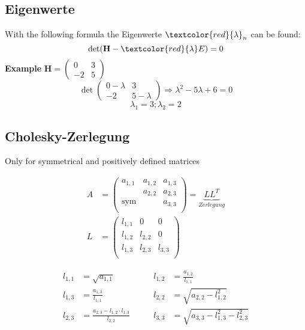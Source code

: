 \subsection{Eigenwerte}\label{eigenwerte}
With the following formula the Eigenwerte $\textcolor{red}{\lambda}_n$ can be found:
\begin{equation}
	\det(\mathbf{H} - \textcolor{red}{\lambda} E) = 0
\end{equation}
\noindent\textbf{Example}
$\mathbf{H} = \begin{pmatrix} 0 & 3 \\ -2 & 5 \end{pmatrix}$
\\
\[\det\begin{pmatrix}
	0 - \lambda & 3 \\
	-2 & 5 - \lambda
\end{pmatrix} \Rightarrow \lambda^2 - 5\lambda + 6 = 0\]
\[{\scriptstyle \lambda_1 = 3; \lambda_2 = 2}\]


\subsection{Cholesky-Zerlegung}
Only for symmetrical and positively defined matrices

\begin{align*}
	A &= \begin{pmatrix}
		a_{1,1}    & a_{1,2} & a_{1,3} \\
		& a_{2,2} & a_{2,3} \\
		\text{sym} &         & a_{3,3} \\
	\end{pmatrix} = \underbrace{LL^T}_{Zerlegung} \\
	L &= 
	\begin{pmatrix}
		l_{1,1} & 0 & 0 \\
		l_{1,2} & l_{2,2} & 0 \\
		l_{1,3} & l_{2,3} & l_{3,3} \\
	\end{pmatrix}
\end{align*}


\begin{align*}
	l_{1,1} &= \sqrt{a_{1,1}} &\qquad l_{1,2} &= \frac{a_{1,2}}{l_{1,1}} \\
	l_{1,3} &= \frac{a_{1,3}}{l_{1,1}} &\qquad l_{2,2} &= \sqrt{a_{2,2} - l_{1,2}^2} \\
	l_{2,3} &= \frac{a_{2,3} - l_{1,2} \cdot l_{1,3}}{l_{2,2}} &\qquad l_{3,3} &= \sqrt{a_{3,3} - l_{1,3}^2 - l_{2,3}^2} \\
\end{align*}
